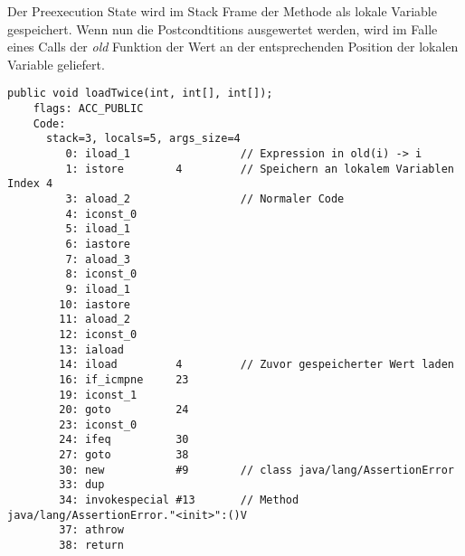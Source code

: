 Der Preexecution State wird im Stack Frame der Methode als lokale Variable gespeichert. Wenn nun 
die Postcondtitions ausgewertet werden, wird im Falle eines Calls der \textit{old} Funktion der Wert 
an der entsprechenden Position der lokalen Variable geliefert.
\newline
\begin{lstlisting}[caption=Bytecode der loadTwice Prozedur mit postcondition mit Zugriff auf old State. Damit der Code etwas Übersichtlicher ist\, wurde nur die erste Postcondtition kompiliert.,label={lst:loadtwice_code_old}]
public void loadTwice(int, int[], int[]);
    flags: ACC_PUBLIC
    Code:
      stack=3, locals=5, args_size=4
         0: iload_1                 // Expression in old(i) -> i 
         1: istore        4         // Speichern an lokalem Variablen Index 4
         3: aload_2                 // Normaler Code
         4: iconst_0      
         5: iload_1       
         6: iastore       
         7: aload_3       
         8: iconst_0      
         9: iload_1       
        10: iastore       
        11: aload_2       
        12: iconst_0      
        13: iaload        
        14: iload         4         // Zuvor gespeicherter Wert laden
        16: if_icmpne     23
        19: iconst_1      
        20: goto          24
        23: iconst_0      
        24: ifeq          30
        27: goto          38
        30: new           #9        // class java/lang/AssertionError
        33: dup           
        34: invokespecial #13       // Method java/lang/AssertionError."<init>":()V
        37: athrow        
        38: return
\end{lstlisting}


